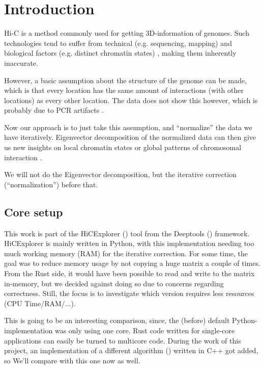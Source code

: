 \chapter{Introduction}\label{chap:introduction}


Hi-C is a method commonly used for getting 3D-information of genomes. Such
technologies tend to suffer from technical (e.g. sequencing, mapping)
\cite{pmid21646344} and biological factors (e.g. distinct chromatin states)
\cite{pmid19693276}, making them inherently inaccurate.

However, a basic assumption about the structure of the genome can be made,
which is that every location has the same amount of interactions (with other
locations) as every other location. The data does not show this however, which
is probably due to PCR artifacts \cite{wingett2015hicup}.

Now our approach is to just take this assumption, and ``normalize'' the data we
have iteratively. Eigenvector decomposition of the normalized data can then
give us new insights on local chromatin states or global patterns of
chromosomal interaction \cite{imakaev2012iterative}.

We will not do the Eigenvector decomposition, but the iterative correction (``normalization'') before that.


\section{Core setup}\label{sec:setup}


This work is part of the HiCExplorer () tool from the
Deeptools () framework. HiCExplorer is mainly written in
Python, with this implementation needing too much working memory (RAM) for the
iterative correction. For some time, the goal was to reduce memory usage by not
copying a huge matrix a couple of times. From the Rust side, it would have been
possible to read and write to the matrix in-memory, but we decided against
doing so due to concerns regarding correctness. Still, the focus is to
investigate which version requires less resources (CPU Time/RAM/...).

This is going to be an interesting comparison, since, the (before) default
Python-implementation was only using one core. Rust code written for
single-core applications can easily be turned to multicore code. During the
work of this project, an implementation of a different algorithm
() written in C++ got added, so We'll compare with this one now
as well.

